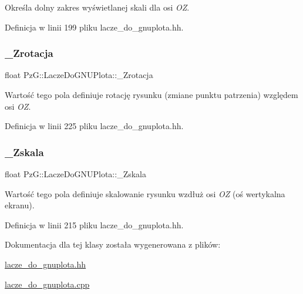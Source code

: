 Określa dolny zakres wyświetlanej skali dla osi {\itshape OZ}. 

Definicja w linii 199 pliku lacze\+\_\+do\+\_\+gnuplota.\+hh.

\mbox{\label{class_pz_g_1_1_lacze_do_g_n_u_plota_aa65781b1ff96dfb31a780e98ee28d6ed}} 
\subsubsection{\texorpdfstring{\_Zrotacja}{\_Zrotacja}}
{\footnotesize\ttfamily float Pz\+G\+::\+Lacze\+Do\+G\+N\+U\+Plota\+::\+\_\+\+Zrotacja\hspace{0.3cm}{\ttfamily [protected]}}

Wartość tego pola definiuje rotację rysunku (zmiane punktu patrzenia) względem osi {\itshape OZ}. 

Definicja w linii 225 pliku lacze\+\_\+do\+\_\+gnuplota.\+hh.

\mbox{\label{class_pz_g_1_1_lacze_do_g_n_u_plota_a85446d06b2d714b2f852ef43c47c73c1}} 
\subsubsection{\texorpdfstring{\_Zskala}{\_Zskala}}
{\footnotesize\ttfamily float Pz\+G\+::\+Lacze\+Do\+G\+N\+U\+Plota\+::\+\_\+\+Zskala\hspace{0.3cm}{\ttfamily [protected]}}

Wartość tego pola definiuje skalowanie rysunku wzdłuż osi {\itshape OZ} (oś wertykalna ekranu). 

Definicja w linii 215 pliku lacze\+\_\+do\+\_\+gnuplota.\+hh.



Dokumentacja dla tej klasy została wygenerowana z plików\+:\begin{DoxyCompactItemize}
\item 
\mbox{\hyperlink{lacze__do__gnuplota_8hh}{lacze\+\_\+do\+\_\+gnuplota.\+hh}}\item 
\mbox{\hyperlink{lacze__do__gnuplota_8cpp}{lacze\+\_\+do\+\_\+gnuplota.\+cpp}}\end{DoxyCompactItemize}
